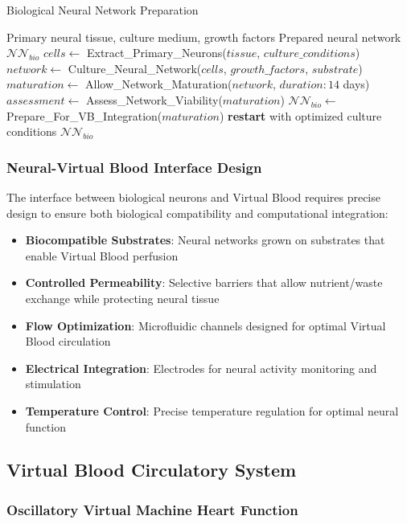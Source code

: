 \documentclass[12pt,a4paper]{article}
\begin{document}
\begin{algorithm}
\caption{Biological Neural Network Preparation}
\begin{algorithmic}[1]
\REQUIRE Primary neural tissue, culture medium, growth factors
\ENSURE Prepared neural network $\mathcal{NN}_{bio}$
\STATE $cells \leftarrow$ Extract\_Primary\_Neurons($tissue$, $culture\_conditions$)
\STATE $network \leftarrow$ Culture\_Neural\_Network($cells$, $growth\_factors$, $substrate$)
\STATE $maturation \leftarrow$ Allow\_Network\_Maturation($network$, $duration: 14$ days)
\STATE $assessment \leftarrow$ Assess\_Network\_Viability($maturation$)
    \STATE $\mathcal{NN}_{bio} \leftarrow$ Prepare\_For\_VB\_Integration($maturation$)
\ELSE
    \STATE \textbf{restart} with optimized culture conditions
\ENDIF
\RETURN $\mathcal{NN}_{bio}$
\end{algorithmic}
\end{algorithm}

\subsubsection{Neural-Virtual Blood Interface Design}

The interface between biological neurons and Virtual Blood requires precise design to ensure both biological compatibility and computational integration:

\begin{itemize}
\item \textbf{Biocompatible Substrates}: Neural networks grown on substrates that enable Virtual Blood perfusion
\item \textbf{Controlled Permeability}: Selective barriers that allow nutrient/waste exchange while protecting neural tissue
\item \textbf{Flow Optimization}: Microfluidic channels designed for optimal Virtual Blood circulation
\item \textbf{Electrical Integration}: Electrodes for neural activity monitoring and stimulation
\item \textbf{Temperature Control}: Precise temperature regulation for optimal neural function
\end{itemize}

\subsection{Virtual Blood Circulatory System}

\subsubsection{Oscillatory Virtual Machine Heart Function}
\end{document}
